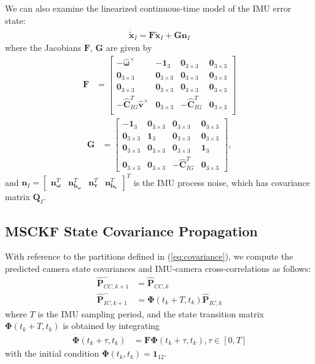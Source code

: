 \documentclass[letterpaper, 10 pt, conference]{ieeeconf}  %
\def\Vec#1{\mathbf{#1}}
\newcommand{\bbm}{\begin{bmatrix}}
\newcommand{\ebm}{\end{bmatrix}}
\begin{document}
We can also examine the linearized continuous-time model of the IMU error state:
\begin{align}
    \dot{\widetilde{\Vec{x}}}_I = \Vec{F}\widetilde{\Vec{x}}_I + \Vec{G}\Vec{n}_I
\end{align}
where the Jacobians $\Vec{F}$, $\Vec{G}$ are given by
\begin{align}
\Vec{F} &= \bbm -\hat{\boldsymbol{\omega}}^\times & -\Vec{1}_3 & \Vec{0}_{3\times3} & \Vec{0}_{3\times3} \\
                    \Vec{0}_{3\times3} & \Vec{0}_{3\times3} & \Vec{0}_{3\times3} & \Vec{0}_{3\times3} \\
                    \Vec{0}_{3\times3} & \Vec{0}_{3\times3} & \Vec{0}_{3\times3} & \Vec{0}_{3\times3} \\
                    -\hat{\Vec{C}}_{I G}^T \hat{\Vec{v}}^\times & \Vec{0}_{3\times3} & -\hat{\Vec{C}}_{I G}^T & \Vec{0}_{3\times3} \\
            \ebm
\end{align}
\begin{align}
\Vec{G} &=  \bbm    -\Vec{1}_3 & \Vec{0}_{3\times3} & \Vec{0}_{3\times3} & \Vec{0}_{3\times3} \\
                                \Vec{0}_{3\times3} & \Vec{1}_3 & \Vec{0}_{3\times3} & \Vec{0}_{3\times3} \\
                                \Vec{0}_{3\times3} & \Vec{0}_{3\times3} & \Vec{0}_{3\times3} & \Vec{1}_3 \\
                                \Vec{0}_{3\times3} & \Vec{0}_{3\times3} & -\hat{\Vec{C}}_{I G}^T & \Vec{0}_{3\times3}
            \ebm ,
\end{align}
and $\Vec{n}_I = \bbm \Vec{n}_{\boldsymbol{\omega}}^T & \Vec{n}_{\Vec{b}_{\boldsymbol{\omega}}}^T & \Vec{n}_{\Vec{v}}^T & \Vec{n}_{\Vec{b}_{\Vec{v}}}^T \ebm^T$ is the IMU process noise, which has covariance matrix $\Vec{Q}_I$.

\subsection{MSCKF State Covariance Propagation}
With reference to the partitions defined in (\ref{eq:covariance}), we compute the predicted camera state covariances and IMU-camera cross-correlations as follows:
\begin{align}
    \hat{\Vec{P}}^-_{CC,k+1} &= \hat{\Vec{P}}_{CC,k} \\
    \hat{\Vec{P}}^-_{IC,k+1} &= \boldsymbol{\Phi}\left(t_k + T, t_k \right) \hat{\Vec{P}}_{IC,k}
\end{align}
where $T$ is the IMU sampling period, and the state transition matrix $\boldsymbol{\Phi}\left(t_k + T, t_k \right)$ is obtained by integrating
\begin{align} \label{eq:statetransition}
    \dot{\boldsymbol{\Phi}}\left(t_k + \tau, t_k \right) &= \Vec{F} \boldsymbol{\Phi}\left(t_k + \tau, t_k \right), \tau\in\left[0,T\right]
\end{align}
with the initial condition $\boldsymbol{\Phi}\left(t_k, t_k \right) = \Vec{1}_{12}$.
\end{document}
